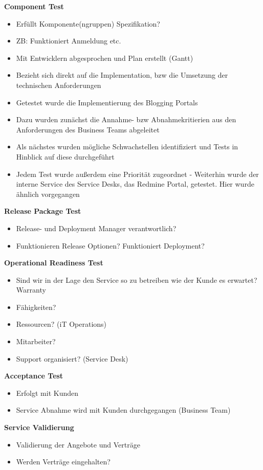 \documentclass[sigconf]{acmart}
\begin{document}
\textbf{Component Test}
\begin{itemize}
\item Erfüllt Komponente(ngruppen) Spezifikation?
\item ZB: Funktioniert Anmeldung etc.
\item Mit Entwicklern abgesprochen und Plan erstellt (Gantt)
\item Bezieht sich direkt auf die Implementation, bzw die Umsetzung der technischen Anforderungen
\item Getestet wurde die Implementierung des Blogging Portals
\item Dazu wurden zunächst die Annahme- bzw Abnahmekritierien aus den Anforderungen des Business Teams abgeleitet
\item Als nächstes wurden mögliche Schwachstellen identifiziert und Tests in Hinblick auf diese durchgeführt
\item Jedem Test wurde außerdem eine Priorität zugeordnet - Weiterhin wurde der interne Service des Service Desks, das Redmine Portal, getestet. Hier wurde ähnlich vorgegangen
\end{itemize}
\textbf{Release Package Test}
\begin{itemize}
\item Release- und Deployment Manager verantwortlich?
\item Funktionieren Release Optionen? Funktioniert Deployment?
\end{itemize}
\textbf{Operational Readiness Test}
\begin{itemize}
\item Sind wir in der Lage den Service so zu betreiben wie der Kunde es erwartet? Warranty
\item Fähigkeiten?
\item Ressourcen? (iT Operations)
\item Mitarbeiter?
\item Support organisiert? (Service Desk)
\end{itemize}
\textbf{Acceptance Test}
\begin{itemize}
\item Erfolgt mit Kunden
\item Service Abnahme wird mit Kunden durchgegangen (Business
Team)
\end{itemize}
\textbf{Service Validierung}
\begin{itemize}
\item Validierung der Angebote und Verträge
\item Werden Verträge eingehalten?
\end{itemize}
\end{document}
